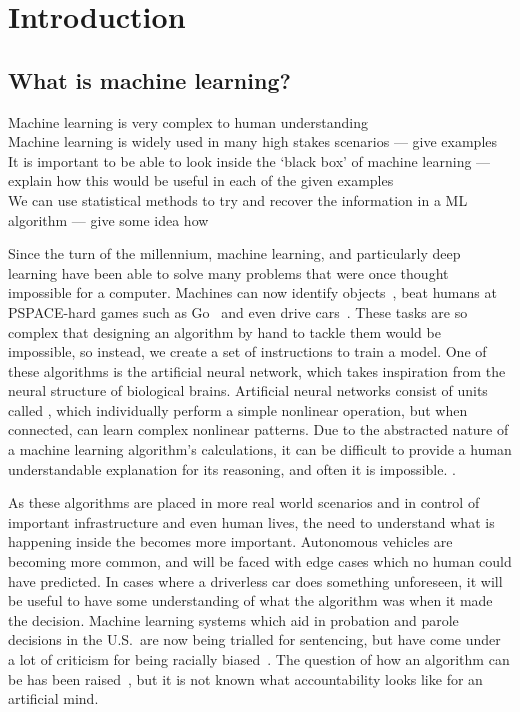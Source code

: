 
\chapter{Introduction}

\section{What is machine learning?}
\begin{todo}
	Machine learning is very complex to human understanding \\
	Machine learning is widely used in many high stakes scenarios --- give examples \\
	It is important to be able to look inside the `black box' of machine learning --- explain how this would be useful in each of the given examples \\
	We can use statistical methods to try and recover the information in a ML algorithm --- give some idea how
\end{todo}

Since the turn of the millennium, machine learning, and particularly deep learning have been able to solve many problems that were once thought impossible for a computer.
Machines can now identify objects~\autocite{li2018}, beat humans at PSPACE-hard games such as Go~\autocite{chao2018} and even drive cars~\autocite{gerla2014}.
These tasks are so complex that designing an algorithm by hand to tackle them would be impossible, so instead, we create a set of instructions to train a model.
One of these  algorithms is the artificial neural network, which takes inspiration from the neural structure of biological brains.
Artificial neural networks consist of units called , which individually perform a simple nonlinear operation, but when connected, can learn complex nonlinear patterns.
Due to the abstracted nature of a machine learning algorithm's calculations, it can be difficult to provide a human understandable explanation for its reasoning, and often it is impossible.
.

As these algorithms are placed in more real world scenarios and in control of important infrastructure and even human lives, the need to understand what is happening inside the  becomes more important.
Autonomous vehicles are becoming more common, and will be faced with edge cases which no human could have predicted.
In cases where a driverless car does something unforeseen, it will be useful to have some understanding of what the algorithm was  when it made the decision.
Machine learning systems which aid in probation and parole decisions in the U.S.\ are now being trialled for sentencing, but have come under a lot of criticism for being racially biased~\autocite{christin2015}.
The question of how an algorithm can be  has been raised~\autocite[9]{christin2015}, but it is not known what accountability looks like for an artificial mind.
